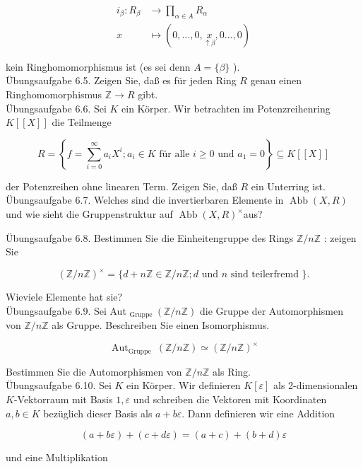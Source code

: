 \documentclass[10pt, letterpaper]{article}
\begin{document}
$$
\begin{aligned}
i_{\beta}: R_{\beta} & \rightarrow \prod_{\alpha \in A} R_{\alpha} \\
x & \mapsto(0, \ldots, 0, \underset{\uparrow \beta}{x}, 0 \ldots, 0)
\end{aligned}
$$

kein Ringhomomorphismus ist (es sei denn $A=\{\beta\}$ ).\\
Übungsaufgabe 6.5. Zeigen Sie, daß es für jeden Ring $R$ genau einen Ringhomomorphismus $\mathbb{Z} \rightarrow R$ gibt.\\
Übungsaufgabe 6.6. Sei $K$ ein Körper. Wir betrachten im Potenzreihenring $K[[X]]$ die Teilmenge

$$
R=\left\{f=\sum_{i=0}^{\infty} a_{i} X^{i} ; a_{i} \in K \text { für alle } i \geq 0 \text { und } a_{1}=0\right\} \subseteq K[[X]]
$$

der Potenzreihen ohne linearen Term. Zeigen Sie, daß $R$ ein Unterring ist.\\
Übungsaufgabe 6.7. Welches sind die invertierbaren Elemente in $\operatorname{Abb}(X, R)$ und wie sieht die Gruppenstruktur auf $\operatorname{Abb}(X, R)^{\times}$aus?

Übungsaufgabe 6.8. Bestimmen Sie die Einheitengruppe des Rings $\mathbb{Z} / n \mathbb{Z}$ : zeigen Sie

$$
(\mathbb{Z} / n \mathbb{Z})^{\times}=\{d+n \mathbb{Z} \in \mathbb{Z} / n \mathbb{Z} ; d \text { und } n \text { sind teilerfremd }\} .
$$

Wieviele Elemente hat sie?\\
Übungsaufgabe 6.9. Sei Aut ${ }_{\text {Gruppe }}(\mathbb{Z} / n \mathbb{Z})$ die Gruppe der Automorphismen von $\mathbb{Z} / n \mathbb{Z}$ als Gruppe. Beschreiben Sie einen Isomorphismus.

$$
\operatorname{Aut}_{\text {Gruppe }}(\mathbb{Z} / n \mathbb{Z}) \simeq(\mathbb{Z} / n \mathbb{Z})^{\times}
$$

Bestimmen Sie die Automorphismen von $\mathbb{Z} / n \mathbb{Z}$ als Ring.\\
Übungsaufgabe 6.10. Sei $K$ ein Körper. Wir definieren $K[\varepsilon]$ als 2-dimensionalen $K$-Vektorraum mit Basis $1, \varepsilon$ und schreiben die Vektoren mit Koordinaten $a, b \in K$ bezüglich dieser Basis als $a+b \varepsilon$. Dann definieren wir eine Addition

$$
(a+b \varepsilon)+(c+d \varepsilon)=(a+c)+(b+d) \varepsilon
$$

und eine Multiplikation
\end{document}
